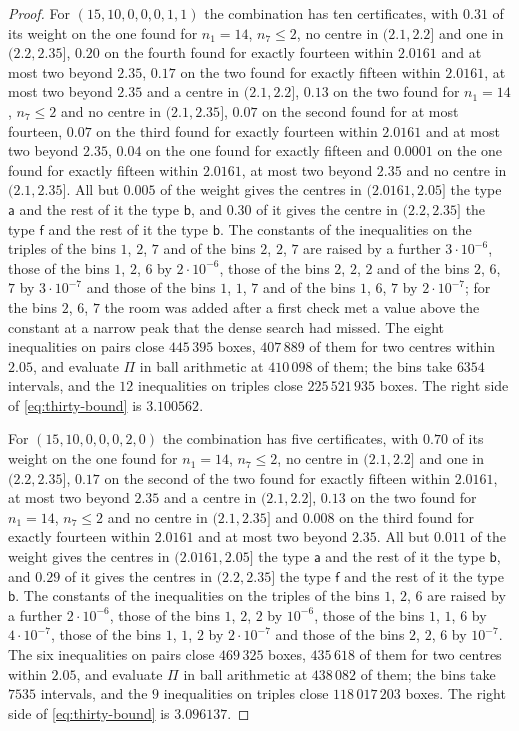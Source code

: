 \documentclass[11pt,reqno]{amsart}
\renewcommand{\_}{\origunderscore\allowbreak}
\numberwithin{equation}{section}
\theoremstyle{plain}
\theoremstyle{definition}
\theoremstyle{remark}
\begin{document}
\begin{proof}
For $(15,10,0,0,0,1,1)$ the combination has ten certificates, with $0.31$
of its weight on the one found for $n_1=14$, $n_7\le2$, no centre in
$(2.1,2.2]$ and one in $(2.2,2.35]$, $0.20$ on the fourth found for
exactly fourteen within $2.0161$ and at most two beyond $2.35$, $0.17$ on
the two found for exactly fifteen within $2.0161$, at most two beyond
$2.35$ and a centre in $(2.1,2.2]$, $0.13$ on the two found for $n_1=14$,
$n_7\le2$ and no centre in $(2.1,2.35]$, $0.07$ on the second found for at
most fourteen, $0.07$ on the third found for exactly fourteen within
$2.0161$ and at most two beyond $2.35$, $0.04$ on the one found for
exactly fifteen and $0.0001$ on the one found for exactly fifteen within
$2.0161$, at most two beyond $2.35$ and no centre in $(2.1,2.35]$. All but
$0.005$ of the weight gives the centres in $(2.0161,2.05]$ the type
$\mathsf a$ and the rest of it the type $\mathsf b$, and $0.30$ of it gives
the centre in $(2.2,2.35]$ the type $\mathsf f$ and the rest of it the
type $\mathsf b$. The constants of the inequalities on the triples of the
bins $1$, $2$, $7$ and of the bins $2$, $2$, $7$ are raised by a further
$3\cdot10^{-6}$, those of the bins $1$, $2$, $6$ by $2\cdot10^{-6}$, those
of the bins $2$, $2$, $2$ and of the bins $2$, $6$, $7$ by
$3\cdot10^{-7}$ and those of the bins $1$, $1$, $7$ and of the bins $1$,
$6$, $7$ by $2\cdot10^{-7}$; for the bins $2$, $6$, $7$ the room was added
after a first check met a value above the constant at a narrow peak that
the dense search had missed. The eight inequalities on pairs close
$445\,395$ boxes, $407\,889$ of them for two centres within $2.05$, and
evaluate $\Pi$ in ball arithmetic at $410\,098$ of them; the bins take
$6354$ intervals, and the $12$ inequalities on triples close
$225\,521\,935$ boxes. The right side of \eqref{eq:thirty-bound} is
$3.100562$.

For $(15,10,0,0,0,2,0)$ the combination has five certificates, with $0.70$
of its weight on the one found for $n_1=14$, $n_7\le2$, no centre in
$(2.1,2.2]$ and one in $(2.2,2.35]$, $0.17$ on the second of the two found
for exactly fifteen within $2.0161$, at most two beyond $2.35$ and a centre
in $(2.1,2.2]$, $0.13$ on the two found for $n_1=14$, $n_7\le2$ and no
centre in $(2.1,2.35]$ and $0.008$ on the third found for exactly fourteen
within $2.0161$ and at most two beyond $2.35$. All but $0.011$ of the
weight gives the centres in $(2.0161,2.05]$ the type $\mathsf a$ and the
rest of it the type $\mathsf b$, and $0.29$ of it gives the centres in
$(2.2,2.35]$ the type $\mathsf f$ and the rest of it the type $\mathsf b$.
The constants of the inequalities on the triples of the bins $1$, $2$, $6$
are raised by a further $2\cdot10^{-6}$, those of the bins $1$, $2$, $2$
by $10^{-6}$, those of the bins $1$, $1$, $6$ by $4\cdot10^{-7}$, those of
the bins $1$, $1$, $2$ by $2\cdot10^{-7}$ and those of the bins $2$, $2$,
$6$ by $10^{-7}$. The six inequalities on pairs close $469\,325$ boxes,
$435\,618$ of them for two centres within $2.05$, and evaluate $\Pi$ in
ball arithmetic at $438\,082$ of them; the bins take $7535$ intervals, and
the $9$ inequalities on triples close $118\,017\,203$ boxes. The right side
of \eqref{eq:thirty-bound} is $3.096137$.


\end{proof}
\end{document}
